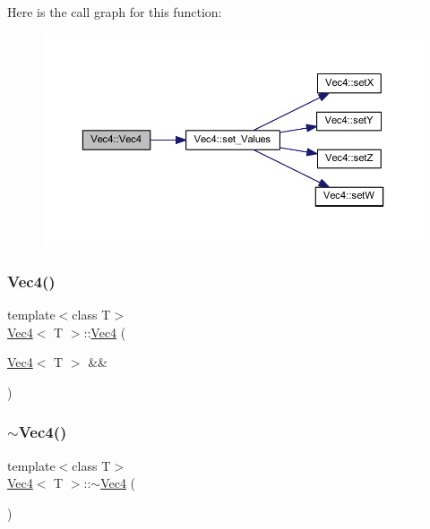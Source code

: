 Here is the call graph for this function\+:
\nopagebreak
\begin{figure}[H]
\begin{center}
\leavevmode
\includegraphics[width=350pt]{class_vec4_adcfec79e821f101e76ff6bc39f170b3b_cgraph}
\end{center}
\end{figure}
\mbox{\label{class_vec4_a6c58c1104701d83123df793b4286b03a}} 
\subsubsection{\texorpdfstring{Vec4()}{Vec4()}\hspace{0.1cm}{\footnotesize\ttfamily [3/4]}}
{\footnotesize\ttfamily template$<$class T$>$ \\
\mbox{\hyperlink{class_vec4}{Vec4}}$<$ T $>$\+::\mbox{\hyperlink{class_vec4}{Vec4}} (\begin{DoxyParamCaption}\item[{\mbox{\hyperlink{class_vec4}{Vec4}}$<$ T $>$ \&\&}]{ }\end{DoxyParamCaption})\hspace{0.3cm}{\ttfamily [default]}}

\mbox{\label{class_vec4_a0c2e1161cc05cc200b4b14affb48279d}} 
\subsubsection{\texorpdfstring{$\sim$Vec4()}{~Vec4()}}
{\footnotesize\ttfamily template$<$class T$>$ \\
\mbox{\hyperlink{class_vec4}{Vec4}}$<$ T $>$\+::$\sim$\mbox{\hyperlink{class_vec4}{Vec4}} (\begin{DoxyParamCaption}{ }\end{DoxyParamCaption})\hspace{0.3cm}{\ttfamily [inline]}}



